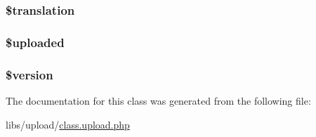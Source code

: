 \subsubsection[{\$translation}]{\setlength{\rightskip}{0pt plus 5cm}\$translation}\label{classupload_a1f198d410fecc3871ebdd468d343a5e3}
\hypertarget{classupload_a5e92bb37ab892f2f238ed28c5c2c40d2}{}
\subsubsection[{\$uploaded}]{\setlength{\rightskip}{0pt plus 5cm}\$uploaded}\label{classupload_a5e92bb37ab892f2f238ed28c5c2c40d2}
\hypertarget{classupload_a17c8948c68aa44fa9961ae169b6a8961}{}
\subsubsection[{\$version}]{\setlength{\rightskip}{0pt plus 5cm}\$version}\label{classupload_a17c8948c68aa44fa9961ae169b6a8961}


The documentation for this class was generated from the following file\+:\begin{DoxyCompactItemize}
\item 
libs/upload/\hyperlink{class_8upload_8php}{class.\+upload.\+php}\end{DoxyCompactItemize}
